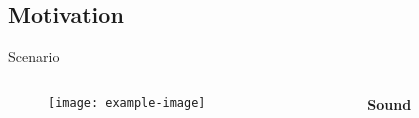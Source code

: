 \subsection{Motivation}

\begin{frame}{Scenario}

    \begin{columns}[onlytextwidth]
        \begin{column}{0.69\textwidth}
            \begin{figure}
                \texttt{[image: example-image]}
            \end{figure}
        \end{column}
        \begin{column}{0.29\textwidth}
            \textbf{Sound}
            \begin{itemize}
            \end{itemize}
        \end{column}
    \end{columns}

\end{frame}

